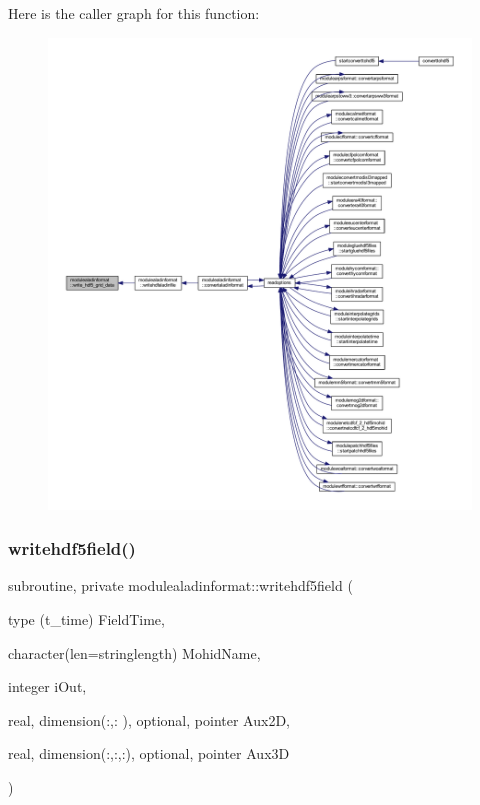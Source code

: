 Here is the caller graph for this function\+:\nopagebreak
\begin{figure}[H]
\begin{center}
\leavevmode
\includegraphics[width=350pt]{namespacemodulealadinformat_aae0b88b8feec26aab01ab56220392544_icgraph}
\end{center}
\end{figure}
\mbox{\label{namespacemodulealadinformat_a9b5030d175b249bcc7e4f88c7e8bffec}} 
\subsubsection{\texorpdfstring{writehdf5field()}{writehdf5field()}}
{\footnotesize\ttfamily subroutine, private modulealadinformat\+::writehdf5field (\begin{DoxyParamCaption}\item[{type (t\+\_\+time)}]{Field\+Time,  }\item[{character(len=stringlength)}]{Mohid\+Name,  }\item[{integer}]{i\+Out,  }\item[{real, dimension(\+:,\+:  ), optional, pointer}]{Aux2D,  }\item[{real, dimension(\+:,\+:,\+:), optional, pointer}]{Aux3D }\end{DoxyParamCaption})\hspace{0.3cm}{\ttfamily [private]}}

